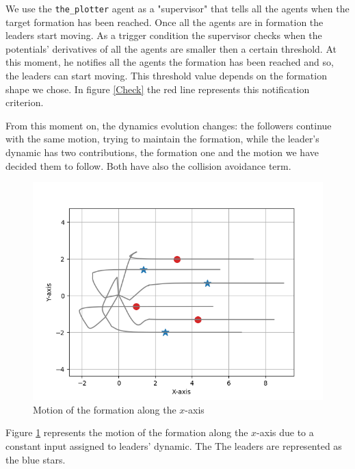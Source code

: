 \documentclass[a4paper,11pt,oneside]{book}
\begin{document}
\bigskip
We use the \texttt{the\_plotter} agent as a "supervisor" that tells all the agents when the target formation has been reached. Once all the agents are in formation the leaders start moving. As a trigger condition the supervisor checks when the potentials' derivatives of all the agents are smaller then a certain threshold. At this moment, he notifies all the agents the formation has been reached and so, the leaders can start moving. This threshold value depends on the formation shape we chose. In figure \ref{Check} the red line represents this notification criterion.

\bigskip
From this moment on, the dynamics evolution changes: the followers continue with the same motion, trying to maintain the formation, while the leader's dynamic has two contributions, the formation one and the motion we have decided them to follow. Both have also the collision avoidance term.

\begin{figure}[h]
\centering
	\includegraphics[scale=0.5]{Moving_hexagon_formation_linear}
	\caption{Motion of the formation along the $x$-axis}
	\label{Formation_motion_lin}
\end{figure}

Figure \ref{Formation_motion_lin} represents the motion of the formation along the $x$-axis due to a constant input assigned to leaders' dynamic. The The leaders are represented as the blue stars.
\end{document}
